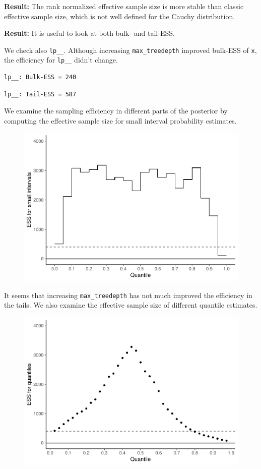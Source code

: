 \documentclass[american,]{article}
\begin{document}
\textbf{Result:} The rank normalized effective sample size is more
stable than classic effective sample size, which is not well defined for
the Cauchy distribution.

\textbf{Result:} It is useful to look at both bulk- and tail-ESS.

We check also \texttt{lp\_\_}. Although increasing
\texttt{max\_treedepth} improved bulk-ESS of \texttt{x}, the efficiency
for \texttt{lp\_\_} didn't change.

\begin{verbatim}
lp__: Bulk-ESS = 240
\end{verbatim}

\begin{verbatim}
lp__: Tail-ESS = 587
\end{verbatim}

We examine the sampling efficiency in different parts of the posterior
by computing the effective sample size for small interval probability
estimates.

\begin{figure}[t]
  \centering
  \includegraphics[width=0.6\linewidth]{graphics/local-ess-fit-nom-td20-1.pdf}
\end{figure}

It seems that increasing \texttt{max\_treedepth} has not much improved
the efficiency in the tails. We also examine the effective sample size
of different quantile estimates.

\begin{figure}[t]
  \centering
  \includegraphics[width=0.6\linewidth]{graphics/quantile-ess-fit-nom-td20-1.pdf}
\end{figure}
\end{document}
